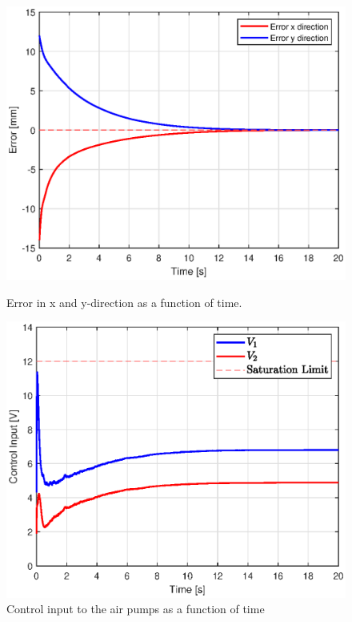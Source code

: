 \begin{figure}[H]
    \centering
\begin{minipage}{0.5\textwidth}
        \centering
        \includegraphics[width=\textwidth]{Figures/Chapter5/errorxysim.eps} 
        \caption{Error in x and y-direction as a function of time.}
        \label{fig5:errorsim}
    \end{minipage}\hfill
    \begin{minipage}{0.5\textwidth}
        \centering
        \includegraphics[width=\textwidth]{Figures/Chapter5/controlinputsim.eps} 
        \caption{Control input to the air pumps as a function of time}

\end{minipage}
\end{figure}

